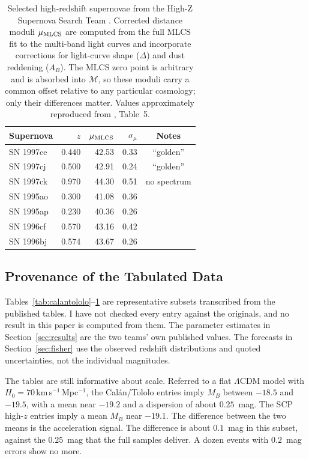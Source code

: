 \documentclass[12pt]{article}
\begin{document}
\begin{table}[ht]
\centering
\caption{Selected high-redshift supernovae from the High-Z Supernova
Search Team \citep{Riess1998}.  Corrected distance moduli $\mu_{\rm MLCS}$
are computed from the full MLCS fit to the multi-band light curves
and incorporate corrections for light-curve shape ($\Delta$) and
dust reddening ($A_B$).  The MLCS zero point is arbitrary and is absorbed
into $\mathcal{M}$, so these moduli carry a common offset relative to any
particular cosmology; only their differences matter.  Values approximately
reproduced from \citet{Riess1998}, Table~5.}
\label{tab:hiZ_hzt}
\medskip
\begin{tabular}{lrrrc}
\toprule
Supernova & $z$ & $\mu_{\rm MLCS}$ & $\sigma_\mu$ & Notes \\
\midrule
SN 1997ce & 0.440 & 42.53 & 0.33 & ``golden'' \\
SN 1997cj & 0.500 & 42.91 & 0.24 & ``golden'' \\
SN 1997ck & 0.970 & 44.30 & 0.51 & no spectrum \\
SN 1995ao & 0.300 & 41.08 & 0.36 & \\
SN 1995ap & 0.230 & 40.36 & 0.26 & \\
SN 1996cf & 0.570 & 43.16 & 0.42 & \\
SN 1996bj & 0.574 & 43.67 & 0.26 & \\
\bottomrule
\end{tabular}
\end{table}

\subsection{Provenance of the Tabulated Data}
\label{sec:provenance}

Tables~\ref{tab:calantololo}--\ref{tab:hiZ_hzt} are representative subsets
transcribed from the published tables.  I have not checked every entry against
the originals, and no result in this paper is computed from them.  The
parameter estimates in Section~\ref{sec:results} are the two teams' own
published values.  The forecasts in Section~\ref{sec:fisher} use the observed
redshift distributions and quoted uncertainties, not the individual magnitudes.

The tables are still informative about scale.  Referred to a flat $\Lambda$CDM
model with $H_0 = 70$\,km\,s$^{-1}$\,Mpc$^{-1}$, the Cal\'an/Tololo entries
imply $M_B$ between $-18.5$ and $-19.5$, with a mean near $-19.2$ and a
dispersion of about $0.25$~mag.  The SCP high-$z$ entries imply a mean $M_B$
near $-19.1$.  The difference between the two means is the acceleration signal.
The difference is about $0.1$~mag in this subset, against the $0.25$~mag that
the full samples deliver.  A dozen events with $0.2$~mag errors show no more.
\end{document}
